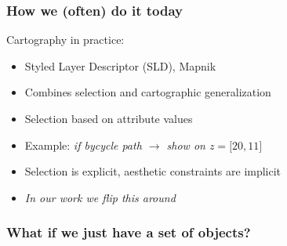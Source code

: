 \documentclass{beamer}
\begin{document}
\frame
{
  \frametitle{How we (often) do it today}
  Cartography in practice:
  \begin{itemize}
  \item Styled Layer Descriptor (SLD), Mapnik
  \item Combines selection and cartographic generalization
  \item Selection based on attribute values
  \item Example: \emph{if bycycle path $\rightarrow$ show on $z=\lbrack 20, 11\rbrack$}
  \item Selection is explicit, aesthetic constraints are implicit
  \item \emph{In our work we flip this around}
  \end{itemize}
}

\frame
{
  \frametitle{What if we just have a set of objects?}
 \begin{center}
  \end{center}
}
\end{document}
